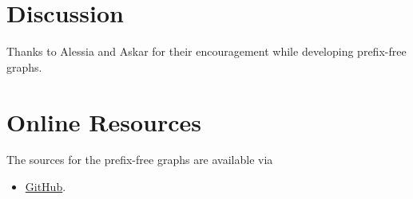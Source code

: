 \documentclass[twocolumn]{ceurart}
\begin{document}
\section{Discussion}

\begin{acknowledgments}
    Thanks to Alessia and Askar for their encouragement while developing prefix-free graphs.
\end{acknowledgments}



\appendix

\section{Online Resources}

The sources for the prefix-free graphs are available via
\begin{itemize}
\item \href{https://github.com/andynet/pfg}{GitHub}.
\end{itemize}
\end{document}

